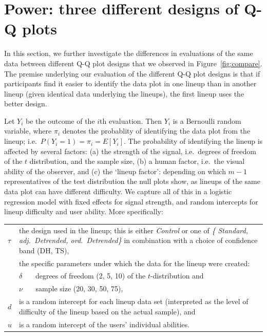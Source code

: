 \documentclass[12pt]{article}\usepackage[]{graphicx}\usepackage[]{color}
\begin{document}
\section{Power: three different designs of Q-Q plots}\label{sec:power1}

In this section, we further investigate the differences in evaluations of the same data between different Q-Q plot designs that we observed in Figure~\ref{fig:compare}. 
The premise underlying our evaluation of the different Q-Q plot designs is that if participants find it easier to identify the data plot in one lineup than in another lineup (given identical data underlying the lineups), the first lineup uses the better design.

Let $Y_i$ be the outcome of the $i$th evaluation. Then $Y_i$ is a Bernoulli random variable, where $\pi_i$ denotes the probablity of identifying the data plot from the lineup; i.e.~$P(Y_i = 1) = \pi_i = E[Y_i]$.   
The probability of identifying the lineup is affected by several factors: (a) the strength of the signal, i.e.~degrees of freedom of the $t$ distribution, and the sample size, (b) a human factor, i.e.~the visual ability of the observer, and (c)  the `lineup factor': depending on which $m-1$ representatives of the test distribution the null plots show, as lineups of the same data plot can have different difficulty. We capture all of this in a logistic regression model with fixed effects for signal strength, and random intercepts for lineup difficulty and user ability. More specifically: 


\begin{center}
\begin{tabular}{lp{5in}}
$\tau$ & the design used in the lineup; this is either {\it Control} or one of  {\it \{  Standard, adj.\ Detrended, ord.\ Detrended\}} in combination with a choice of confidence band (DH, TS), \\
&  the specific parameters under which the data for the lineup were created: \\
&  $\delta$ \ \ \ degrees of freedom (2, 5, 10) {of the $t$-distribution} and \\
&  $\nu$  \ \ \ sample size (20, 30, 50, 75), \\
$d$ & is a random intercept for each lineup data set (interpreted as the level of difficulty of the lineup based on the actual sample), and \\
$u$ & is a random intercept of the users' individual abilities.
 \end{tabular}
\end{center}
%
\end{document}
